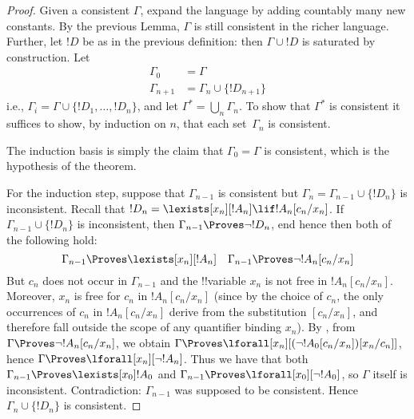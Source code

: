 \documentclass[../../include/open-logic-section]{subfiles}
\begin{document}
\begin{proof}
Given a consistent $\Gamma$, expand the language by adding countably
many new constants. By the previous Lemma, $\Gamma$ is still
consistent in the richer language. Further, let $!D$ be as in the
previous definition: then $\Gamma \cup !D$ is saturated by
construction. Let
\begin{align*}
\Gamma_0 & = \Gamma \\
\Gamma_{n+1} & = \Gamma_n \cup \{!D_{n+1} \}
\end{align*}
i.e., $\Gamma_i = \Gamma \cup \{ !D_1, \dots, !D_n \}$, and let
$\Gamma^* = \bigcup_{n} \Gamma_n$.  To show that $\Gamma^*$ is
consistent it suffices to show, by induction on $n$, that each
set~$\Gamma_n$ is consistent.

The induction basis is simply the claim that $\Gamma_0 = \Gamma$ is
consistent, which is the hypothesis of the theorem.

For the induction step, suppose that $\Gamma_{n-1}$ is consistent but
$\Gamma_n = \Gamma_{n-1} \cup \{!D_n\}$ is inconsistent. Recall that
$!D_{n} = \lexists[x_n][!A_n] \lif !A_n [c_n/x_n]$.  If $\Gamma_{n-1}
\cup \{!D_n\}$ is inconsistent, then $\Gamma_{n-1} \Proves \lnot
!D_n$, end hence then both of the following hold:
\[
\Gamma_{n-1} \Proves \lexists[x_n][!A_n]
\quad
\Gamma_{n-1} \Proves \lnot !A_n[c_n/x_n]
\]
But $c_n$ does not occur in $\Gamma_{n-1}$ and the !!{variable} $x_n$
is not free in $!A_n[c_n/x_n]$. Moreover, $x_n$ is free for $c_n$ in
$!A_n [c_n/x_n]$ (since by the choice of $c_n$, the only occurrences
of $c_n$ in $!A_n [c_n/x_n]$ derive from the substitution $[c_n/x_n]$,
and therefore fall outside the scope of any quantifier binding
$x_n$). By , from $\Gamma
\Proves \lnot !A_n [c_n/x_n]$, we obtain $\Gamma \Proves
\lforall[x_n][(\lnot !A_0 [c_n/x_n])[x_n/c_n]]$, hence $\Gamma \Proves
\lforall[x_n][\lnot !A_n]$. Thus we have that both $\Gamma_{n-1}
\Proves \lexists[x_0] !A_0$ and $\Gamma_{n-1} \Proves
\lforall[x_0][\lnot !A_0]$, so $\Gamma$ itself is
inconsistent. Contradiction: $\Gamma_{n-1}$ was supposed to be
consistent. Hence $\Gamma_n \cup \{ !D_n\}$ is consistent.
\end{proof}
\end{document}
